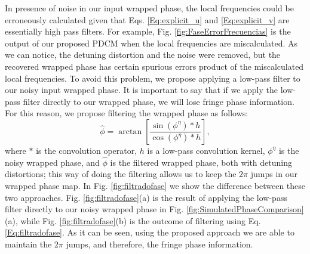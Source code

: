 In presence of noise in our input wrapped phase, the local frequencies could be
erroneously calculated given that Eqs. \ref{Eq:explicit_u} and
\ref{Eq:explicit_v} are essentially high pass filters. For example, Fig.
\ref{fig:FaseErrorFrecuencias} is the output of our proposed PDCM
when the local frequencies are miscalculated. As we can notice, the detuning
distortion and the noise were removed, but the recovered wrapped phase has
certain spurious errors product of the miscalculated local frequencies. To
avoid this problem, we propose applying a low-pass filter to our noisy input
wrapped phase. It is important to say that if we apply the low-pass filter
directly to our wrapped phase, we will lose fringe phase information. For this
reason, we propose filtering the wrapped phase as follows:
\begin{equation} \label{Eq:filtradofase}
	\hat{\phi} = \arctan \left[ \frac{\sin(\phi^\eta) * h}
	{\cos(\phi^\eta) * h} \right],
\end{equation}
where $*$ is the convolution operator, $h$ is a low-pass convolution 
kernel, $\phi^\eta$ is the noisy wrapped phase, and $\hat \phi$ is the
filtered wrapped phase, both with detuning distortions; this way of doing
the filtering allows us to keep the $2\pi$ jumps in our wrapped phase map. In
Fig. \ref{fig:filtradofase} we show the difference between these two approaches.
Fig. \ref{fig:filtradofase}(a) is the result of applying the low-pass filter 
directly to our noisy wrapped phase in Fig.
\ref{fig:SimulatedPhaseComparison}(a), while Fig. \ref{fig:filtradofase}(b)
is the outcome of filtering using Eq. \ref{Eq:filtradofase}. As it can be seen,
using the proposed approach we are able to maintain the $2\pi$ jumps, and
therefore, the fringe phase information.

